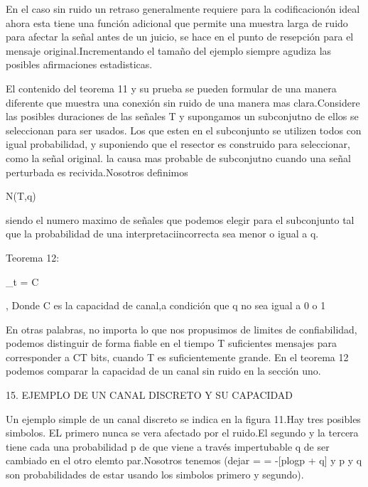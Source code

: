 En el caso sin ruido un retraso generalmente requiere para la codificacion\'on ideal ahora 
esta tiene una funci\'on adicional que permite una muestra larga de ruido para afectar la señal antes de un juicio, se hace 
en el punto de resepci\'on  para el mensaje original.Incrementando el tamaño del ejemplo siempre agudiza las posibles 
afirmaciones estadisticas.

El contenido del teorema 11 y su prueba se pueden formular de una manera diferente que muestra 
una conexi\'on sin ruido de una manera mas clara.Considere las posibles duraciones de las señales T y supongamos 
un subconjutno de ellos se seleccionan para ser usados. Los que esten en el subconjunto se utilizen todos con igual probabilidad, y suponiendo 
que el resector es construido para seleccionar, como la señal original. la causa mas probable de subconjutno cuando 
una señal perturbada es recivida.Nosotros definimos \begin{em}N(T,q)\end{em} siendo el numero maximo de señales que podemos elegir para el 
subconjunto tal que la probabilidad de una interpretaci\on incorrecta sea menor o igual a q.

\begin{em}Teorema 12:\end{em} \displaystyle\lim_{t \to{}\infty} = C \begin{em}, Donde C es la capacidad de canal,a condici\'on que q no sea igual a 0 o 1\end{em}

En otras palabras, no importa lo que nos propusimos de limites de confiabilidad, podemos distinguir de forma fiable en el tiempo T 
suficientes mensajes para corresponder a CT bits, cuando T es suficientemente grande. En el teorema 12 podemos comparar 
la capacidad de un canal sin ruido en la secci\'on uno.

\begin{center}
15. EJEMPLO DE UN CANAL DISCRETO Y SU CAPACIDAD
\end{center} 

Un ejemplo simple de un canal discreto se indica en la figura 11.Hay tres posibles simbolos. EL primero 
nunca se vera afectado por el ruido.El segundo y la tercera tiene cada una probabilidad p de que viene a trav\'es impertubable q 
de ser cambiado en el otro elemto par.Nosotros tenemos (dejar =  \alpha = -[plogp + q] y p y q son probabilidades de estar usando los simbolos primero y segundo).

